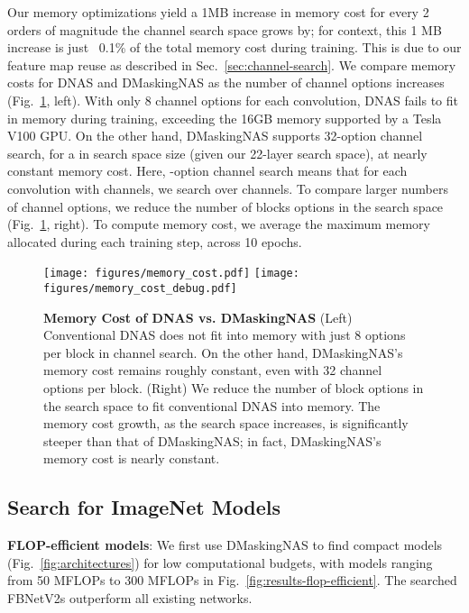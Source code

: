 \documentclass[10pt,twocolumn,letterpaper]{article}
\begin{document}
Our memory optimizations yield a 1MB increase in memory cost for every 2 orders of magnitude the channel search space grows by; for context, this 1 MB increase is just ~0.1\% of the total memory cost during training. This is due to our feature map reuse as described in Sec.~\ref{sec:channel-search}. We compare memory costs for DNAS and DMaskingNAS as the number of channel options increases (Fig.~\ref{fig:memory-cost}, left). With only 8 channel options for each convolution, DNAS fails to fit in memory during training, exceeding the 16GB memory supported by a Tesla V100 GPU. On the other hand, DMaskingNAS supports 32-option channel search, for a  in search space size (given our 22-layer search space), at nearly constant memory cost. Here, -option channel search means that for each convolution with  channels, we search over  channels. To compare larger numbers of channel options, we reduce the number of blocks options in the search space (Fig.~\ref{fig:memory-cost}, right). To compute memory cost, we average the maximum memory allocated during each training step, across 10 epochs.

\begin{figure}
    \centering
    \texttt{[image: figures/memory\_cost.pdf]}
    \texttt{[image: figures/memory\_cost\_debug.pdf]}
    \caption{\textbf{Memory Cost of DNAS vs. DMaskingNAS} (Left) Conventional DNAS does not fit into memory with just 8 options per block in channel search. On the other hand, DMaskingNAS's memory cost remains roughly constant, even with 32 channel options per block. (Right) We reduce the number of block options in the search space to fit conventional DNAS into memory. The memory cost growth, as the search space increases, is significantly steeper than that of DMaskingNAS; in fact, DMaskingNAS's memory cost is nearly constant.}
    \label{fig:memory-cost}
\end{figure}

\subsection{Search for ImageNet Models}

\textbf{FLOP-efficient models}: We first use DMaskingNAS to find compact models (Fig.~\ref{fig:architectures}) for low computational budgets, with models ranging from 50 MFLOPs to 300 MFLOPs in Fig.~\ref{fig:results-flop-efficient}. The searched FBNetV2s outperform all existing networks.
\end{document}

